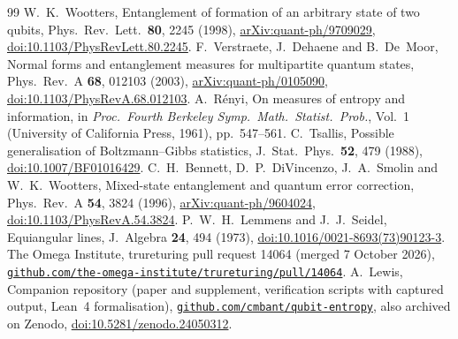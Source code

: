 \documentclass[11pt]{article}
\begin{document}
\begin{thebibliography}{99}
 W.~K.~Wootters, Entanglement of formation of an arbitrary state of two qubits, Phys.\ Rev.\ Lett.\
\textbf{80}, 2245 (1998), \href{https://arxiv.org/abs/quant-ph/9709029}{arXiv:quant-ph/9709029}, \href{https://doi.org/10.1103/PhysRevLett.80.2245}{doi:10.1103/PhysRevLett.80.2245}.
\bibitem{VDD} F.~Verstraete, J.~Dehaene and B.~De~Moor, Normal forms and entanglement measures for multipartite quantum
states, Phys.\ Rev.\ A \textbf{68}, 012103 (2003), \href{https://arxiv.org/abs/quant-ph/0105090}{arXiv:quant-ph/0105090}, \href{https://doi.org/10.1103/PhysRevA.68.012103}{doi:10.1103/PhysRevA.68.012103}.
\bibitem{Renyi} A.~R\'enyi, On measures of entropy and information, in \emph{Proc.\ Fourth Berkeley Symp.\ Math.\
Statist.\ Prob.}, Vol.~1 (University of California Press, 1961), pp.~547--561.
\bibitem{Tsallis} C.~Tsallis, Possible generalisation of Boltzmann--Gibbs statistics, J.\ Stat.\ Phys.\ \textbf{52},
479 (1988), \href{https://doi.org/10.1007/BF01016429}{doi:10.1007/BF01016429}.
\bibitem{BDSW} C.~H.~Bennett, D.~P.~DiVincenzo, J.~A.~Smolin and W.~K.~Wootters, Mixed-state entanglement and quantum
error correction, Phys.\ Rev.\ A \textbf{54}, 3824 (1996), \href{https://arxiv.org/abs/quant-ph/9604024}{arXiv:quant-ph/9604024}, \href{https://doi.org/10.1103/PhysRevA.54.3824}{doi:10.1103/PhysRevA.54.3824}.
\bibitem{LS} P.~W.~H.~Lemmens and J.~J.~Seidel, Equiangular lines, J.\ Algebra \textbf{24}, 494 (1973), \href{https://doi.org/10.1016/0021-8693(73)90123-3}{doi:10.1016/0021-8693(73)90123-3}.
\bibitem{Omega} The Omega Institute, trureturing pull request 14064 (merged 7 October 2026),
\href{https://github.com/the-omega-institute/trureturing/pull/14064}{\texttt{github.com/the-omega-institute/trureturing/pull/14064}}.
\bibitem{Companion} A.~Lewis, Companion repository (paper and supplement, verification scripts with captured output,
Lean~4 formalisation), \href{https://github.com/cmbant/qubit-entropy}{\texttt{github.com/cmbant/qubit-entropy}}, also archived on Zenodo, \href{https://doi.org/10.5281/zenodo.24050312}{doi:10.5281/zenodo.24050312}.
\end{thebibliography}
\end{document}
